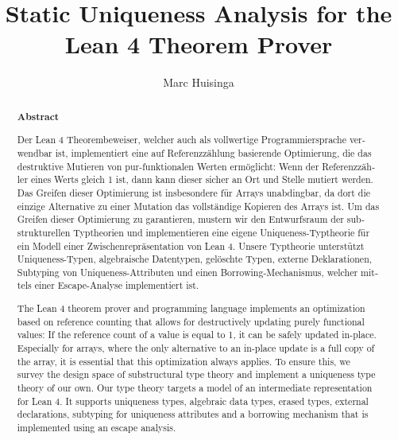 \documentclass[parskip=no,12pt,a4paper,twoside,headings=openright, fleqn]{scrreprt}
\title{Static Uniqueness Analysis for the Lean 4 Theorem Prover}
\author{Marc Huisinga}
\begin{document}
\begin{otherlanguage}{ngerman} %
\mytitlepage
\end{otherlanguage}

\begin{abstract}
\begin{center}\Huge\textbf{\textsf{Abstract}}
\end{center}
\vfill

\begin{otherlanguage}{ngerman}
Der Lean 4 Theorembeweiser, welcher auch als vollwertige Programmiersprache verwendbar ist, implementiert eine auf Referenzzählung basierende Optimierung, die das destruktive Mutieren von pur-funktionalen Werten ermöglicht: Wenn der Referenzzähler eines Werts gleich 1 ist, dann kann dieser sicher an Ort und Stelle mutiert werden. Das Greifen dieser Optimierung ist insbesondere für Arrays unabdingbar, da dort die einzige Alternative zu einer Mutation das vollständige Kopieren des Arrays ist. Um das Greifen dieser Optimierung zu garantieren, mustern wir den Entwurfsraum der substrukturellen Typtheorien und implementieren eine eigene Uniqueness-Typtheorie für ein Modell einer Zwischenrepräsentation von Lean 4. Unsere Typtheorie unterstützt Uniqueness-Typen, algebraische Datentypen, gelöschte Typen, externe Deklarationen, Subtyping von Uniqueness-Attributen und einen Borrowing-Mechanismus, welcher mittels einer Escape-Analyse implementiert ist.
\end{otherlanguage}
\vfill
The Lean 4 theorem prover and programming language implements an optimization based on reference counting that allows for destructively updating purely functional values: If the reference count of a value is equal to 1, it can be safely updated in-place. Especially for arrays, where the only alternative to an in-place update is a full copy of the array, it is essential that this optimization always applies. To ensure this, we survey the design space of substructural type theory and implement a uniqueness type theory of our own. Our type theory targets a model of an intermediate representation for Lean 4. It supports uniqueness types, algebraic data types, erased types, external declarations, subtyping for uniqueness attributes and a borrowing mechanism that is implemented using an escape analysis.
\vfill
\end{abstract}

\tableofcontents









\end{document}
